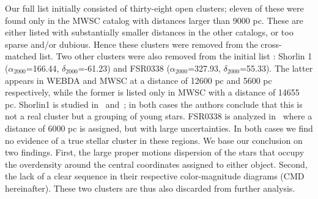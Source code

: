 \documentclass[referee]{aa}
\begin{document}
\begin{table}
\begin{tabular}{llrrrrrrrrr}
 \hline
 \end{tabular}
 \end{table}

 Our full list initially consisted of thirty-eight open clusters; eleven of
 these were found only in the MWSC catalog with distances larger than 9000 pc.
 These are either listed with substantially smaller distances in the other
 catalogs, or too sparse and/or dubious. Hence these clusters were removed from
 the cross-matched list.
 Two other clusters were also removed from the initial list : Shorlin 1 
 ($\alpha_{2000}$=166.44, $\delta_{2000}$=-61.23) and FSR0338
 ($\alpha_{2000}$=327.93, $\delta_{2000}$=55.33). The latter appears in WEBDA and
 MWSC at a distance of 12600 pc and 5600 pc respectively, while the former is
 listed only in MWSC with a distance of 14655 pc. Shorlin1 is studied
 in~\cite{Carraro_2009} and~\cite{Turner_2012}; in both cases the authors
 conclude that this is not a real cluster but a grouping of young stars.
 FSR0338 is analyzed in~\cite{Froebrich_2010} where a distance of 6000 pc is
 assigned, but with large uncertainties.
 In both cases we find no evidence of a true stellar cluster in these regions.
 We base our conclusion on two findings. First, the large proper motions
 dispersion of the stars that occupy the overdensity around the central
 coordinates assigned to either object. Second, the lack of a clear sequence in
 their respective color-magnitude diagrams (CMD hereinafter). These two clusters
 are thus also discarded from further analysis.
\end{document}
